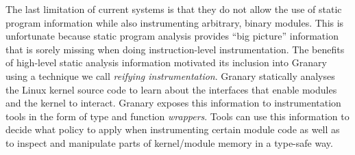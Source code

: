 \documentclass[preprint]{sigplanconf}
\begin{document}



The last limitation of current systems is that they do not allow the use of static program information while also instrumenting arbitrary, binary modules. This is unfortunate because static program analysis provides ``big picture'' information that is sorely missing when doing instruction-level instrumentation. The benefits of high-level static analysis information motivated its inclusion into Granary using a technique we call \emph{reifying instrumentation}. Granary statically analyses the Linux kernel source code to learn about  the interfaces that enable modules and the kernel to interact. Granary exposes this information to instrumentation tools in the form of type and function \emph{wrappers}. Tools can use this information to decide what policy to apply when instrumenting certain module code as well as to inspect and manipulate parts of kernel/module memory in a type-safe way.
\end{document}
